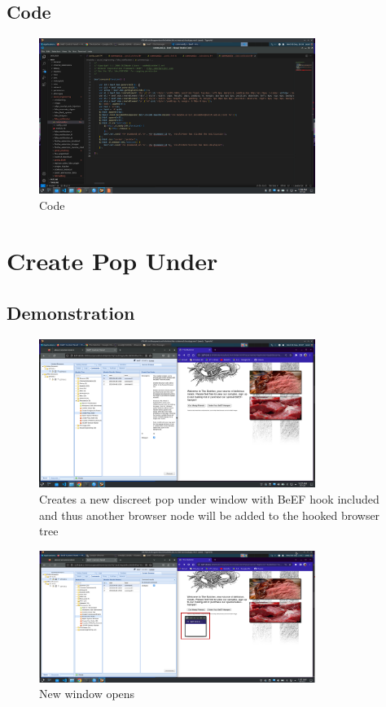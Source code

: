 \documentclass{report}
\begin{document}
\pagebreak

\subsection{Code}
\begin{figure}[!htbp]
    \centering
    \includegraphics[width=0.8\textwidth]{Fake Notification Bar/code.png}
    \caption{Code}
    \label{fig:fn3}
\end{figure}

\pagebreak

\section{Create Pop Under}
\subsection{Demonstration}

\begin{figure}[!htbp]
    \centering
    \includegraphics[width=0.8\textwidth]{Create Pop Under/1.png}
    \caption{Creates a new discreet pop under window with BeEF hook included and thus another browser node will be added to the hooked browser tree}
    \label{fig:cpu1}
\end{figure}

\begin{figure}[!htbp]
    \centering
    \includegraphics[width=0.8\textwidth]{Create Pop Under/2.png}
    \caption{New window opens}
    \label{fig:cpu2}
\end{figure}
\end{document}
